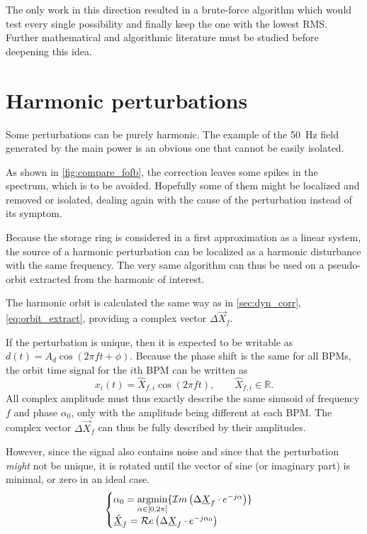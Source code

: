 The only work in this direction resulted in a brute-force algorithm which would test every single possibility and finally keep the one with the lowest RMS. Further mathematical and algorithmic literature must be studied before deepening this idea.

\section{Harmonic perturbations}
\label{sec:loc_dyn}
Some perturbations can be purely harmonic. The example of the \SI{50}{\hertz} field generated by the main power is an obvious one that cannot be easily isolated. 

As shown in \cref{fig:compare_fofb}, the correction leaves some spikes in the spectrum, which is to be avoided. Hopefully some of them might be localized and removed or isolated, dealing again with the cause of the perturbation instead of its symptom.

Because the storage ring is considered in a first approximation as a linear system, the source of a harmonic perturbation can be localized as a harmonic disturbance with the same frequency. The very same algorithm can thus be used on a pseudo-orbit extracted from the harmonic of interest. 

The harmonic orbit is calculated the same way as in \cref{sec:dyn_corr}, \cref{eq:orbit_extract}, providing a complex vector $\Delta\vec{X}_f$.

If the perturbation is unique, then it is expected to be writable as $d(t) = A_d\cos(2\pi f t + \phi)$. Because the phase shift is the same for all BPMs, the orbit time signal for the $i$th BPM can be written as 
\begin{equation}
	x_i(t) = \hat{X}_{f,i} \cos (2\pi f t), \qquad \hat{X}_{f,i} \in \mathbb{R}.
\end{equation}
All complex amplitude must thus exactly describe the same sinusoid of frequency $f$ and phase $\alpha_0$, only with the amplitude being different at each BPM.
The complex vector $\Delta\vec{X}_f$ can thus be fully described by their amplitudes.

However, since the signal also contains noise and since that the perturbation \emph{might} not be unique, it is rotated until the vector of sine (or imaginary part) is minimal, or zero in an ideal case.
\begin{equation}
\begin{cases}\alpha_0 = \underset{\alpha \in [0, 2\pi[}{\textrm{argmin}}\{\mathcal{I}m\left(\Delta\underline{X}_f \cdot e^{-j\alpha}\right) \} \label{eq:harm_perturb_opt}\\
\underline{\hat{X}}_f = \mathcal{R}e\left(\Delta\underline{X}_f \cdot e^{-j\alpha_0}\right)
\end{cases}
\end{equation}

